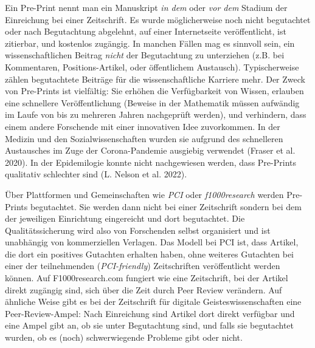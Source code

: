 \documentclass[
  letterpaper,
  DIV=11,
  numbers=noendperiod]{scrreprt}
\begin{document}
\begin{tcolorbox}[enhanced jigsaw, left=2mm, colback=white, colframe=quarto-callout-tip-color-frame, opacitybacktitle=0.6, opacityback=0, title=\textcolor{quarto-callout-tip-color}{\faLightbulb}\hspace{0.5em}{Was ist ein Pre-Print?}, toptitle=1mm, coltitle=black, colbacktitle=quarto-callout-tip-color!10!white, titlerule=0mm, bottomtitle=1mm, leftrule=.75mm, breakable, rightrule=.15mm, bottomrule=.15mm, toprule=.15mm, arc=.35mm]

Ein Pre-Print nennt man ein Manuskript \emph{in dem} oder \emph{vor dem}
Stadium der Einreichung bei einer Zeitschrift. Es wurde möglicherweise
noch nicht begutachtet oder nach Begutachtung abgelehnt, auf einer
Internetseite veröffentlicht, ist zitierbar, und kostenlos zugängig. In
manchen Fällen mag es sinnvoll sein, ein wissenschaftlichen Beitrag
\emph{nicht} der Begutachtung zu unterziehen (z.B. bei Kommentaren,
Positions-Artikel, oder öffentlichem Austausch). Typischerweise zählen
begutachtete Beiträge für die wissenschaftliche Karriere mehr. Der Zweck
von Pre-Prints ist vielfältig: Sie erhöhen die Verfügbarkeit von Wissen,
erlauben eine schnellere Veröffentlichung (Beweise in der Mathematik
müssen aufwändig im Laufe von bis zu mehreren Jahren nachgeprüft
werden), und verhindern, dass einem andere Forschende mit einer
innovativen Idee zuvorkommen. In der Medizin und den
Sozialwissenschaften wurden sie aufgrund des schnelleren Austausches im
Zuge der Corona-Pandemie ausgiebig verwendet (Fraser et al. 2020). In
der Epidemilogie konnte nicht nachgewiesen werden, dass Pre-Prints
qualitativ schlechter sind (L. Nelson et al. 2022).

\end{tcolorbox}

Über Plattformen und Gemeinschaften wie \emph{PCI} oder
\emph{f1000research} werden Pre-Prints begutachtet. Sie werden dann
nicht bei einer Zeitschrift sondern bei dem der jeweiligen Einrichtung
eingereicht und dort begutachtet. Die Qualitätssicherung wird also von
Forschenden selbst organisiert und ist unabhängig von kommerziellen
Verlagen. Das Modell bei PCI ist, dass Artikel, die dort ein positives
Gutachten erhalten haben, ohne weiteres Gutachten bei einer der
teilnehmenden (\emph{PCI-friendly}) Zeitschriften veröffentlicht werden
können. Auf F1000research.com fungiert wie eine Zeitschrift, bei der
Artikel direkt zugängig sind, sich über die Zeit durch Peer Review
verändern. Auf ähnliche Weise gibt es bei der Zeitschrift für digitale
Geisteswissenschaften eine Peer-Review-Ampel: Nach Einreichung sind
Artikel dort direkt verfügbar und eine Ampel gibt an, ob sie unter
Begutachtung sind, und falls sie begutachtet wurden, ob es (noch)
schwerwiegende Probleme gibt oder nicht.
\end{document}
